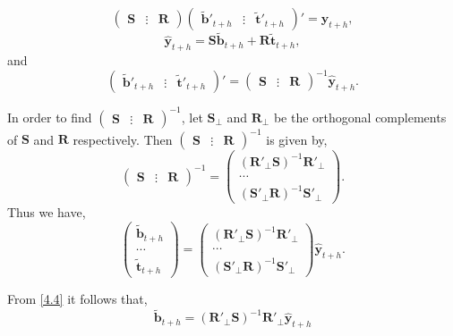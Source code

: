 \documentclass[a4paper, 11pt]{article}
\begin{document}
\[
\begin{pmatrix}
\bm{S} & \vdots& \bm{R}
\end{pmatrix}
\begin{pmatrix}
\tilde{\bm{b}}'_{t+h} & \vdots& \tilde{\bm{t}}'_{t+h}
\end{pmatrix}'
= \hat{\bm{y}}_{t+h},
\]
\[
\hat{\bm{y}}_{t+h} = \bm{S}\tilde{\bm{b}}_{t+h} +  \bm{R}\tilde{\bm{t}}_{t+h},
\]
and
\begin{equation}\label{4.3}
\begin{pmatrix}
\tilde{\bm{b}}'_{t+h} & \vdots& \tilde{\bm{t}}'_{t+h}
\end{pmatrix}' =
\begin{pmatrix}
\bm{S} & \vdots& \bm{R}
\end{pmatrix}^{-1}
\hat{\bm{y}}_{t+h}.
\end{equation}

In order to find $\begin{pmatrix}\bm{S} & \vdots& \bm{R}\end{pmatrix}^{-1}$, let $\bm{S}_{\bot}$ and $\bm{R}_{\bot}$ be the orthogonal complements of $\bm{S}$ and $\bm{R}$
respectively. Then $\begin{pmatrix}\bm{S} & \vdots& \bm{R}\end{pmatrix}^{-1}$ is given by,
\begin{equation}
\begin{pmatrix}\bm{S} & \vdots& \bm{R}\end{pmatrix}^{-1} = \begin{pmatrix}
(\bm{R}'_\bot \bm{S})^{-1}\bm{R}'_\bot \\ \cdots \\ (\bm{S}'_\bot \bm{R})^{-1}\bm{S}'_\bot
\end{pmatrix}.
\end{equation}
Thus we have,
\begin{equation} \label{4.4}
\begin{pmatrix}
\tilde{\bm{b}}_{t+h} \\ \cdots \\ \tilde{\bm{t}}_{t+h}
\end{pmatrix} = \begin{pmatrix}
(\bm{R}'_\bot \bm{S})^{-1}\bm{R}'_\bot \\ \cdots \\ (\bm{S}'_\bot \bm{R})^{-1}\bm{S}'_\bot
\end{pmatrix}\hat{\bm{y}}_{t+h}.
\end{equation}

From \eqref{4.4} it follows that,
\begin{equation}
\tilde{\bm{b}}_{t+h}=(\bm{R}'_\bot \bm{S})^{-1}\bm{R}'_\bot \hat{\bm{y}}_{t+h}
\end{equation}
\end{document}
